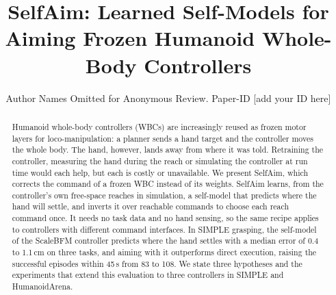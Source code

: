 \documentclass[conference]{IEEEtran}
\begin{document}
\title{SelfAim: Learned Self-Models for Aiming Frozen Humanoid Whole-Body Controllers}

\author{Author Names Omitted for Anonymous Review. Paper-ID [add your ID here]}

\maketitle

\begin{abstract}
Humanoid whole-body controllers (WBCs) are increasingly reused as frozen motor layers for loco-manipulation: a planner sends a hand target and the controller moves the whole body. The hand, however, lands away from where it was told. Retraining the controller, measuring the hand during the reach or simulating the controller at run time would each help, but each is costly or unavailable. We present SelfAim, which corrects the command of a frozen WBC instead of its weights. SelfAim learns, from the controller's own free-space reaches in simulation, a self-model that predicts where the hand will settle, and inverts it over reachable commands to choose each reach command once. It needs no task data and no hand sensing, so the same recipe applies to controllers with different command interfaces. In SIMPLE grasping, the self-model of the ScaleBFM controller predicts where the hand settles with a median error of 0.4 to 1.1\,cm on three tasks, and aiming with it outperforms direct execution, raising the successful episodes within 45\,s from 83 to 108. We state three hypotheses and the experiments that extend this evaluation to three controllers in SIMPLE and HumanoidArena.
\end{abstract}

\IEEEpeerreviewmaketitle

\end{document}

